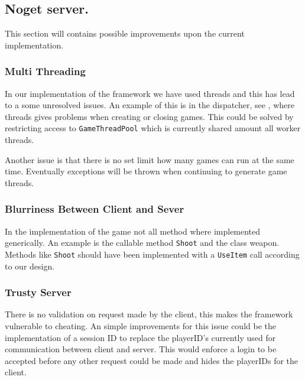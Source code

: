 \subsection{Noget server.}
This section will contains possible improvements upon the current implementation. 

\subsubsection{Multi Threading}
In our implementation of the framework we have used threads and this has lead to a some unresolved issues. An example of this is in the dispatcher, see , where threads gives problems when creating or closing games. This could be solved by restricting access to \texttt{GameThreadPool} which is currently shared amount all worker threads.

Another issue is that there is no set limit how many games can run at the same time. Eventually exceptions will be thrown when continuing to generate game threads.


\subsubsection{Blurriness Between Client and Sever}
In the implementation of the game not all method where implemented generically. An example is the callable method \texttt{Shoot} and the class weapon. Methods like \texttt{Shoot} should have been implemented with a \texttt{UseItem} call according to our design.

\subsubsection{Trusty Server}
There is no validation on request made by the client, this makes the framework vulnerable to cheating. An simple improvements for this issue could be the implementation of a session ID to replace the playerID's currently used for communication between client and server. This would enforce a login to be accepted before any other request could be made and hides the playerIDs for the client.